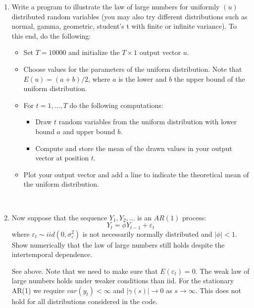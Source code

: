 \documentclass[a4paper]{scrartcl}
\begin{document}
\begin{enumerate}
\begin{solution}
	\end{solution}
	\item Write a program to illustrate the law of large numbers for uniformly $(u)$ distributed random variables (you may also try different distributions such as normal, gamma, geometric, student's t with finite or infinite variance). To this end, do the following:
	\begin{itemize}
		\item Set $T=10000$ and initialize the $T \times 1$ output vector $u$.
		\item Choose values for the parameters of the uniform distribution. Note that $E(u) = (a+b)/2$, where $a$ is the lower and $b$ the upper bound of the uniform distribution.
		\item For $t=1,...,T$ do the following computations:
		\begin{itemize}
			\item Draw $t$ random variables from the uniform distribution with lower bound $a$ and upper bound $b$.
			\item Compute and store the mean of the drawn values in your output vector at position $t$.
		\end{itemize}
		\item Plot your output vector and add a line to indicate the theoretical mean of the uniform distribution.
	\end{itemize}
	\begin{solution}~
		
	\end{solution}
	\item Now suppose that the sequence $Y_{1},Y_{2},\ldots $ is an $AR(1)$
	process:
	$$Y_{t} =\phi Y_{t-1} +\varepsilon _{t}$$
	where $\varepsilon _{t}\sim iid(0,\sigma _{\varepsilon }^{2})$ is not necessarily normally distributed and $|\phi |<1$. Show numerically that the law of large numbers still holds despite the intertemporal dependence.
	\begin{solution}
		See above. Note that we need to make sure that $E(\varepsilon_t)=0$. The weak law of large numbers holds under weaker conditions than iid. For the stationary AR(1) we require $var(y_t)<\infty$ and $|\gamma(s)| \rightarrow 0$ as $s \rightarrow \infty$. This does not hold for all distributions considered in the code.
\newpage %
	\end{solution}
\end{enumerate}
\newpage
\end{document}

